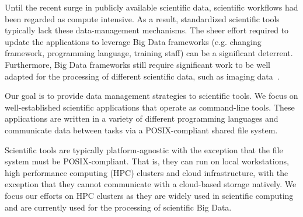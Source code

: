 Until the recent surge in publicly available scientific data, scientific
workflows had been regarded as compute intensive. As a result, standardized
scientific tools typically lack these data-management mechanisms. The sheer
effort required to update the applications to leverage Big Data frameworks (e.g.
changing framework, programming language, training staff) can be a significant
deterrent. Furthermore, Big Data frameworks still require significant work to be
well adapted for the processing of different scientific data, such as imaging
data~\cite{mehta2017comparative}.




%


Our goal is to provide data management strategies to scientific tools. We focus
on well-established scientific applications that operate as command-line tools.
These applications are written in a variety of different programming languages
and communicate data between tasks via a POSIX-compliant shared file system.

Scientific tools are typically platform-agnostic with the exception that the
file system must be POSIX-compliant. That is, they can run on local
workstations, high performance computing (HPC) clusters and cloud
infrastructure, with the exception that they cannot communicate with a
cloud-based storage natively. We focus our efforts on HPC clusters as they are
widely used in scientific computing and are currently used for the processing of
scientific Big Data.

